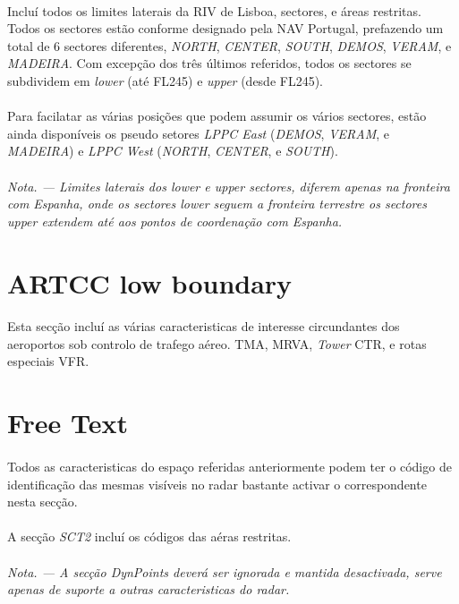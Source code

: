 \documentclass[10pt]{report}
\begin{document}
\paragraph*{} Incluí todos os limites laterais da RIV de Lisboa, sectores, e áreas restritas. Todos
os sectores estão conforme designado pela NAV Portugal, prefazendo um total de 6 sectores
diferentes, \textit{NORTH}, \textit{CENTER}, \textit{SOUTH}, \textit{DEMOS}, \textit{VERAM}, e
\textit{MADEIRA}. Com excepção dos três últimos referidos, todos os sectores se subdividem em
\textit{lower} (até FL245) e \textit{upper} (desde FL245).

\paragraph*{} Para facilatar as várias posições que podem assumir os vários sectores, estão ainda
disponíveis os pseudo setores \textit{LPPC East} (\textit{DEMOS}, \textit{VERAM}, e
\textit{MADEIRA}) e \textit{LPPC West} (\textit{NORTH}, \textit{CENTER}, e \textit{SOUTH}).

\paragraph*{} \textit{Nota. — Limites laterais dos lower e upper sectores, diferem apenas na
fronteira com Espanha, onde os sectores lower seguem a fronteira terrestre os sectores upper
extendem até aos pontos de coordenação com Espanha.}

\section{ARTCC low boundary}

\paragraph*{} Esta secção incluí as várias caracteristicas de interesse circundantes dos aeroportos
sob controlo de trafego aéreo. TMA, MRVA, \textit{Tower} CTR, e rotas especiais VFR.

\section{Free Text}

\paragraph*{} Todos as caracteristicas do espaço referidas anteriormente podem ter o código de
identificação das mesmas visíveis no radar bastante activar o correspondente nesta secção.

\paragraph*{} A secção \textit{SCT2} incluí os códigos das aéras restritas.

\paragraph*{} \textit{Nota. — A secção DynPoints deverá ser ignorada e mantida desactivada, serve
apenas de suporte a outras caracteristicas do radar.}
\end{document}
